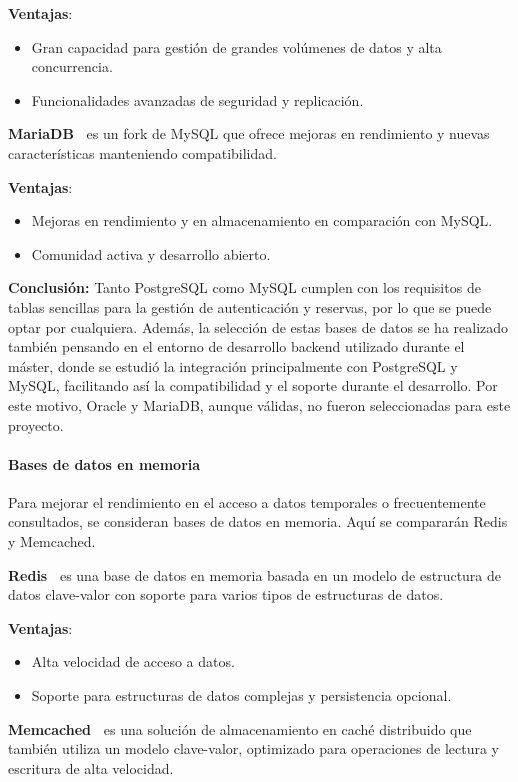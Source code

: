 \textbf{Ventajas}:
\begin{itemize}
\item Gran capacidad para gestión de grandes volúmenes de datos y alta concurrencia.
\item Funcionalidades avanzadas de seguridad y replicación.
\end{itemize}

\textbf{MariaDB~\cite{mariadb}} es un fork de MySQL que ofrece mejoras en rendimiento y nuevas características manteniendo compatibilidad.

\textbf{Ventajas}:
\begin{itemize}
\item Mejoras en rendimiento y en almacenamiento en comparación con MySQL.
\item Comunidad activa y desarrollo abierto.
\end{itemize}

\textbf{Conclusión:} Tanto PostgreSQL como MySQL cumplen con los requisitos de tablas sencillas para la gestión de autenticación y reservas, por lo que se puede optar por cualquiera. Además, la selección de estas bases de datos se ha realizado también pensando en el entorno de desarrollo backend utilizado durante el máster, donde se estudió la integración principalmente con PostgreSQL y MySQL, facilitando así la compatibilidad y el soporte durante el desarrollo. Por este motivo, Oracle y MariaDB, aunque válidas, no fueron seleccionadas para este proyecto.

\paragraph{Bases de datos en memoria}
Para mejorar el rendimiento en el acceso a datos temporales o frecuentemente consultados, se consideran bases de datos en memoria. Aquí se compararán Redis y Memcached.

\textbf{Redis~\cite{redis}} es una base de datos en memoria basada en un modelo de estructura de datos clave-valor con soporte para varios tipos de estructuras de datos.

\textbf{Ventajas}:
\begin{itemize}
\item Alta velocidad de acceso a datos.
\item Soporte para estructuras de datos complejas y persistencia opcional.
\end{itemize}

\textbf{Memcached~\cite{memcached}} es una solución de almacenamiento en caché distribuido que también utiliza un modelo clave-valor, optimizado para operaciones de lectura y escritura de alta velocidad.

